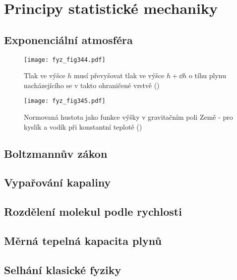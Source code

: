 {
\chapter{Principy statistické mechaniky}\label{fyz:IchapXL}
\minitoc
  \section{Exponenciální atmosféra}\label{fyz:IchapXLsecI}

    \begin{figure}[ht!] %
      \centering
      \texttt{[image: fyz\_fig344.pdf]}
      \caption{Tlak ve výšce \(h\) musí převyšovat tlak ve výšce \(h+\dd{h}\) o tíhu plynu 
               nacházejícího se v takto ohraničené vrstvě
               (\cite[s.~540]{Feynman01})}
      \label{fyz_fig344}
    \end{figure}

    \begin{figure}[ht!] %
      \centering
      \texttt{[image: fyz\_fig345.pdf]}
      \caption{Normovaná hustota jako funkce výšky v gravitačním poli Země - pro kyslík a vodík při 
               konstantní teplotě
               (\cite[s.~541]{Feynman01})}
      \label{fyz_fig345}
    \end{figure}
    
  \section{Boltzmannův zákon}\label{fyz:IchapXLsecII}
  \section{Vypařování kapaliny}\label{fyz:IchapXLsecIII}
  \section{Rozdělení molekul podle rychlosti}\label{fyz:IchapXLsecIV}
  \section{Měrná tepelná kapacita plynů}\label{fyz:IchapXLsecV}
  \section{Selhání klasické fyziky}\label{fyz:IchapXLsecVI}
}

